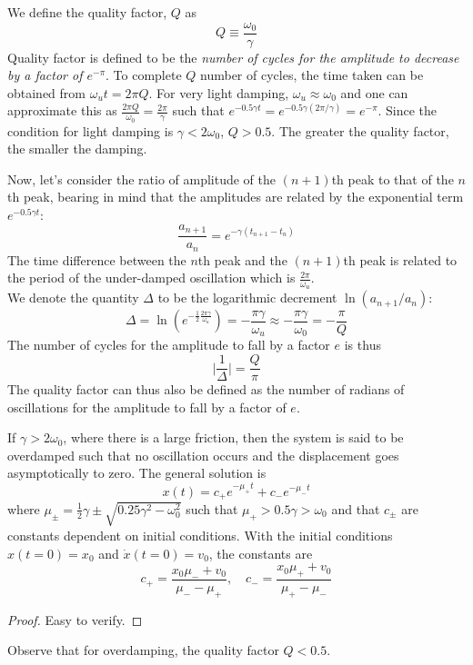 \documentclass[a4paper]{article}
\begin{document}
\begin{defi}
We define the quality factor, $Q$ as
$$Q\equiv\frac{\omega_0}{\gamma}$$
Quality factor is defined to be the \emph{number of cycles for the amplitude to decrease by a factor of $e^{-\pi}$}. To complete $Q$ number of cycles, the time taken can be obtained from $\omega_ut=2\pi Q$. For very light damping, $\omega_u\approx\omega_0$ and one can approximate this as $\frac{2\pi Q}{\omega_0}=\frac{2\pi}{\gamma}$ such that $e^{-0.5\gamma t}=e^{-0.5\gamma(2\pi/\gamma)}=e^{-\pi}$. Since the condition for light damping is $\gamma<2\omega_0$, $Q>0.5$. The greater the quality factor, the smaller the damping.
\end{defi}
\begin{defi}
Now, let's consider the ratio of amplitude of the $(n+1)$th peak to that of the $n$th peak, bearing in mind that the amplitudes are related by the exponential term $e^{-0.5\gamma t}$:
$$\frac{a_{n+1}}{a_n}=e^{-\gamma(t_{n+1}-t_n)}$$
The time difference between the $n$th peak and the $(n+1)$th peak is related to the period of the under-damped oscillation which is $\frac{2\pi}{\omega_u}$.\\[5pt]
We denote the quantity $\Delta$ to be the logarithmic decrement $\ln(a_{n+1}/a_n)$:
$$\Delta=\ln(e^{-\frac{1}{2}\frac{2\pi\gamma}{\omega_u}})=-\frac{\pi\gamma}{\omega_u}\approx-\frac{\pi\gamma}{\omega_0}=-\frac{\pi}{Q}$$
The number of cycles for the amplitude to fall by a factor $e$ is thus
$$\bigg|\frac{1}{\Delta}\bigg|=\frac{Q}{\pi}$$
The quality factor can thus also be defined as the number of radians of oscillations for the amplitude to fall by a factor of $e$.
\end{defi}
\begin{thm}
If $\gamma>2\omega_0$, where there is a large friction, then the system is said to be overdamped such that no oscillation occurs and the displacement goes asymptotically to zero. The general solution is
$$x(t)=c_+e^{-\mu_+t}+c_-e^{-\mu_-t}$$
where $\mu_{\pm}=\frac{1}{2}\gamma\pm\sqrt{0.25\gamma^2-\omega_0^2}$ such that $\mu_+>0.5\gamma>\omega_0$ and that $c_{\pm}$ are constants dependent on initial conditions. With the initial conditions $x(t=0)=x_0$ and $\dot{x}(t=0)=v_0$, the constants are
$$c_+=\frac{x_0\mu_-+v_0}{\mu_--\mu_+},\quad c_-=\frac{x_0\mu_++v_0}{\mu_+-\mu_-}$$
\end{thm}
\begin{proof}
Easy to verify.
\end{proof}
Observe that for overdamping, the quality factor $Q<0.5$.
\end{document}
